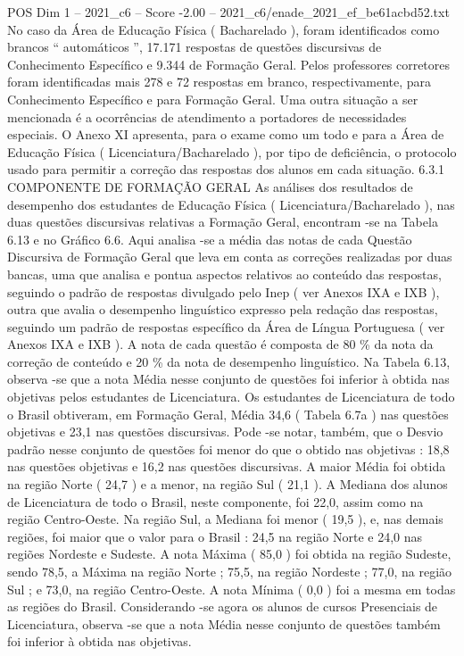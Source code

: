 \begin{textsample}{POS Dim 1 – 2021\_c6 – Score -2.00 – 2021\_c6/enade\_2021\_ef\_be61acbd52.txt}
No caso da Área de Educação Física ( Bacharelado ), foram identificados como brancos “ automáticos ”, 17.171 respostas de questões discursivas de Conhecimento Específico e 9.344 de Formação Geral.
Pelos professores corretores foram identificadas mais 278 e 72 respostas em branco, respectivamente, para Conhecimento Específico e para Formação Geral.
Uma outra situação a ser mencionada é a ocorrências de atendimento a portadores de necessidades especiais.
O Anexo XI apresenta, para o exame como um todo e para a Área de Educação Física ( Licenciatura/Bacharelado ), por tipo de deficiência, o protocolo usado para permitir a correção das respostas dos alunos em cada situação. 6.3.1 COMPONENTE DE FORMAÇÃO GERAL As análises dos resultados de desempenho dos estudantes de Educação Física ( Licenciatura/Bacharelado ), nas duas questões discursivas relativas a Formação Geral, encontram -se na Tabela 6.13 e no Gráfico 6.6.
Aqui analisa -se a média das notas de cada Questão Discursiva de Formação Geral que leva em conta as correções realizadas por duas bancas, uma que analisa e pontua aspectos relativos ao conteúdo das respostas, seguindo o padrão de respostas divulgado pelo Inep ( ver Anexos IXA e IXB ), outra que avalia o desempenho linguístico expresso pela redação das respostas, seguindo um padrão de respostas específico da Área de Língua Portuguesa ( ver Anexos IXA e IXB ).
A nota de cada questão é composta de 80 \% da nota da correção de conteúdo e 20 \% da nota de desempenho linguístico.
Na Tabela 6.13, observa -se que a nota Média nesse conjunto de questões foi inferior à obtida nas objetivas pelos estudantes de Licenciatura.
Os estudantes de Licenciatura de todo o Brasil obtiveram, em Formação Geral, Média 34,6 ( Tabela 6.7a ) nas questões objetivas e 23,1 nas questões discursivas.
Pode -se notar, também, que o Desvio padrão nesse conjunto de questões foi menor do que o obtido nas objetivas : 18,8 nas questões objetivas e 16,2 nas questões discursivas.
A maior Média foi obtida na região Norte ( 24,7 ) e a menor, na região Sul ( 21,1 ).
A Mediana dos alunos de Licenciatura de todo o Brasil, neste componente, foi 22,0, assim como na região Centro-Oeste.
Na região Sul, a Mediana foi menor ( 19,5 ), e, nas demais regiões, foi maior que o valor para o Brasil : 24,5 na região Norte e 24,0 nas regiões Nordeste e Sudeste.
A nota Máxima ( 85,0 ) foi obtida na região Sudeste, sendo 78,5, a Máxima na região Norte ; 75,5, na região Nordeste ; 77,0, na região Sul ; e 73,0, na região Centro-Oeste.
A nota Mínima ( 0,0 ) foi a mesma em todas as regiões do Brasil.
Considerando -se agora os alunos de cursos Presenciais de Licenciatura, observa -se que a nota Média nesse conjunto de questões também foi inferior à obtida nas objetivas.

\end{textsample}
